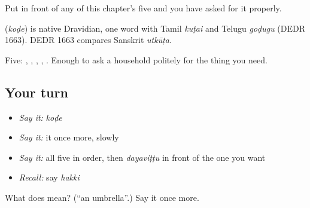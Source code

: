 Put  in front of any of this chapter's five and you have asked for it properly.

\begin{cousinweb}
\textbf{} (\emph{koḍe}) is native Dravidian, one word with Tamil \emph{kuṭai} and Telugu \emph{goḍugu} (DEDR 1663). DEDR 1663 compares Sanskrit \emph{utkūṭa}.
\end{cousinweb}

\begin{grammarlens}[title={What you've built}]
Five: , , , , . Enough to ask a household politely for the thing you need.
\end{grammarlens}

\subsection*{Your turn}
\begin{itemize}
\raggedright
  \item \emph{Say it:} \emph{koḍe}
  \item \emph{Say it:} it once more, slowly
  \item \emph{Say it:} all five in order, then \emph{dayaviṭṭu} in front of the one you want
  \item \emph{Recall:} say \emph{hakki}
\end{itemize}

\begin{tcolorbox}[breakable,colback=teal!4,colframe=teal!35!black,title={Before you move on}]
What does  mean? (\textquotedblleft{}an umbrella\textquotedblright{}.) Say it once more.
\end{tcolorbox}
